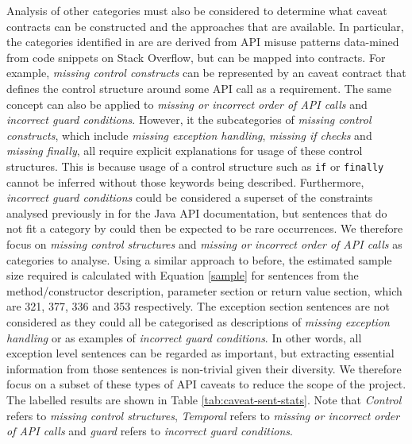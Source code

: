 Analysis of other categories must also be considered to determine what caveat contracts can be constructed and the approaches that are available. In particular, the categories identified in \cite{code-examples} are are derived from API misuse patterns data-mined from code snippets on Stack Overflow, but can be mapped into contracts. For example, \textit{missing control constructs} can be represented by an caveat contract that defines the control structure around some API call as a requirement. The same concept can also be applied to \textit{missing or incorrect order of API calls} and \textit{incorrect guard conditions}. However, it the subcategories of \textit{missing control constructs}, which include \textit{missing exception handling}, \textit{missing if checks} and \textit{missing finally}, all require explicit explanations for usage of these control structures. This is because usage of a control structure such as \lstinline{if} or \lstinline{finally} cannot be inferred without those keywords being described. Furthermore, \textit{incorrect guard conditions} could be considered a superset of the constraints analysed previously in \cite{zhou-directive} for the Java API documentation, but sentences that do not fit a category by \cite{zhou-directive} could then be expected to be rare occurrences. We therefore focus on \textit{missing control structures} and \textit{missing or incorrect order of API calls} as categories to analyse. Using a similar approach to before, the estimated sample size required is calculated with Equation \ref{sample} for sentences from the method/constructor description, parameter section or return value section, which are 321, 377, 336 and 353 respectively. The exception section sentences are not considered as they could all be categorised as descriptions of \textit{missing exception handling} or as examples of \textit{incorrect guard conditions}. In other words, all exception level sentences can be regarded as important, but extracting essential information from those sentences is non-trivial given their diversity. We therefore focus on a subset of these types of API caveats to reduce the scope of the project. The labelled results are shown in Table \ref{tab:caveat-sent-stats}. Note that \textit{Control} refers to \textit{missing control structures}, \textit{Temporal} refers to \textit{missing or incorrect order of API calls} and \textit{guard} refers to \textit{incorrect guard conditions}.\\

